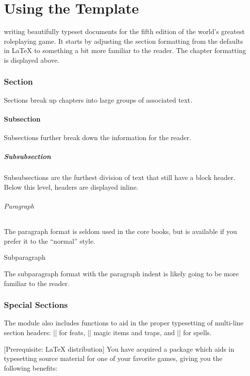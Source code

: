 \part{Using the Template}

 writing beautifully typeset documents for the fifth edition of the world's greatest roleplaying game. It starts by adjusting the section formatting from the defaults in \LaTeX{} to something a bit more familiar to the reader. The chapter formatting is displayed above.

\section{Section}
Sections break up chapters into large groups of associated text.

\subsection{Subsection}
Subsections further break down the information for the reader.

\subsubsection{Subsubsection}
Subsubsections are the furthest division of text that still have a block header. Below this level, headers are displayed inline.

\paragraph{Paragraph}
The paragraph format is seldom used in the core books, but is available if you prefer it to the ``normal'' style.

\subparagraph{Subparagraph}
The subparagraph format with the paragraph indent is likely going to be more familiar to the reader.

\section{Special Sections}
The module also includes functions to aid in the proper typesetting of multi-line section headers: |\DndFeatHeader| for feats, |\DndItemHeader| magic items and traps, and |\DndSpellHeader| for spells.

[Prerequisite: \LaTeX{} distribution]
You have acquired a package which aids in typesetting source material for one of your favorite games, giving you the following benefits:


